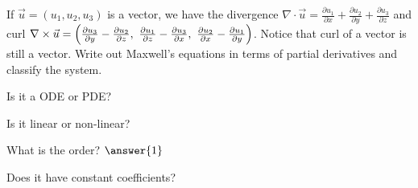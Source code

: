 \documentclass{ximera}
\begin{document}
\begin{exercise}
    If $\vec{u} = (u_1,u_2,u_3)$ is a vector, we have the divergence $\nabla \cdot \vec{u} = \frac{\partial u_1}{\partial x} + \frac{\partial u_2}{\partial y} + \frac{\partial u_3}{\partial z}$ and curl $\nabla \times \vec{u} = \Bigl( \frac{\partial u_3}{\partial y} - \frac{\partial u_2}{\partial z} , ~ \frac{\partial u_1}{\partial z} - \frac{\partial u_3}{\partial x} , ~ \frac{\partial u_2}{\partial x} - \frac{\partial u_1}{\partial y} \Bigr)$. Notice that curl of a vector is still a vector.  Write out Maxwell's equations in terms of partial derivatives and classify the system.
    
    Is it a ODE or PDE?
    \begin{multipleChoice}
    \end{multipleChoice}
    
    \begin{problem}
        Is it linear or non-linear?
        \begin{multipleChoice}
        \end{multipleChoice}
        
        \begin{problem}
            What is the order? $\answer{1}$
            
            \begin{problem}
                Does it have constant coefficients?
                \begin{multipleChoice}
                \end{multipleChoice}
            \end{problem}
        \end{problem}
    \end{problem}
\end{exercise}
\end{document}

